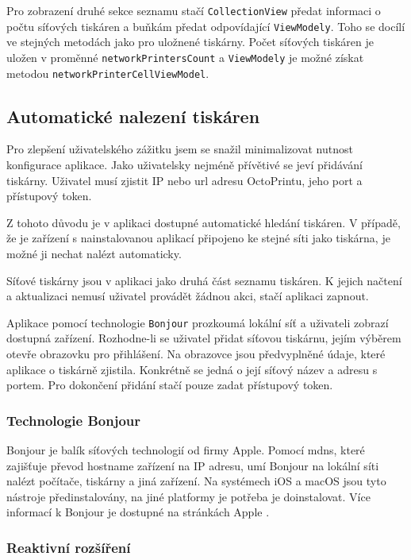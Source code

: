 Pro zobrazení druhé sekce seznamu stačí \texttt{CollectionView} předat informaci o počtu síťových tiskáren a buňkám předat odpovídající \texttt{ViewModely}.
Toho se docílí ve stejných metodách jako pro uložnené tiskárny.
Počet síťových tiskáren je uložen v proměnné \texttt{networkPrintersCount} a \texttt{ViewModely} je možné získat metodou \texttt{networkPrinterCellViewModel}.

\subsection{Automatické nalezení tiskáren}

Pro zlepšení uživatelského zážitku jsem se snažil minimalizovat nutnost konfigurace aplikace.
Jako uživatelsky nejméně přívětivé se jeví přidávání tiskárny.
Uživatel musí zjistit IP nebo \acrshort{url} adresu OctoPrintu, jeho port a přístupový token.

Z tohoto důvodu je v aplikaci dostupné automatické hledání tiskáren.
V případě, že je zařízení s nainstalovanou aplikací připojeno ke stejné síti jako tiskárna, je možné ji nechat nalézt automaticky.

Síťové tiskárny jsou v aplikaci jako druhá část seznamu tiskáren.
K jejich načtení a aktualizaci nemusí uživatel provádět žádnou akci, stačí aplikaci zapnout.

Aplikace pomocí technologie \texttt{Bonjour} prozkoumá lokální síť a uživateli zobrazí dostupná zařízení.
Rozhodne-li se uživatel přidat síťovou tiskárnu, jejím výběrem otevře obrazovku pro přihlášení.
Na obrazovce jsou předvyplněné údaje, které aplikace o tiskárně zjistila.
Konkrétně se jedná o její síťový název a adresu s portem.
Pro dokončení přidání stačí pouze zadat přístupový token.

\subsubsection*{Technologie Bonjour}

Bonjour je balík síťových technologií od firmy Apple.
Pomocí \acrfull{mdns}, které zajišťuje převod hostname zařízení na IP adresu, umí Bonjour na lokální síti nalézt počítače, tiskárny a jiná zařízení.
Na systémech iOS a macOS jsou tyto nástroje předinstalovány, na jiné platformy je potřeba je doinstalovat.
Více informací k Bonjour je dostupné na stránkách Apple \cite{apple-bonjour}.

\subsubsection*{Reaktivní rozšíření}

